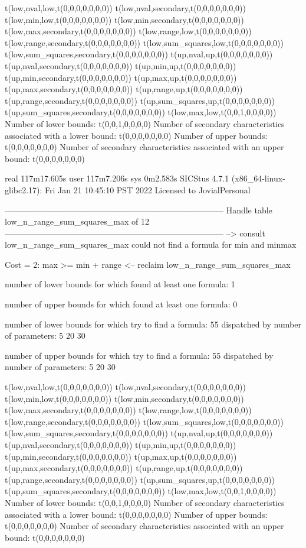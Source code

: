 t(low,nval,low,t(0,0,0,0,0,0,0))
t(low,nval,secondary,t(0,0,0,0,0,0,0))
t(low,min,low,t(0,0,0,0,0,0,0))
t(low,min,secondary,t(0,0,0,0,0,0,0))
t(low,max,secondary,t(0,0,0,0,0,0,0))
t(low,range,low,t(0,0,0,0,0,0,0))
t(low,range,secondary,t(0,0,0,0,0,0,0))
t(low,sum_squares,low,t(0,0,0,0,0,0,0))
t(low,sum_squares,secondary,t(0,0,0,0,0,0,0))
t(up,nval,up,t(0,0,0,0,0,0,0))
t(up,nval,secondary,t(0,0,0,0,0,0,0))
t(up,min,up,t(0,0,0,0,0,0,0))
t(up,min,secondary,t(0,0,0,0,0,0,0))
t(up,max,up,t(0,0,0,0,0,0,0))
t(up,max,secondary,t(0,0,0,0,0,0,0))
t(up,range,up,t(0,0,0,0,0,0,0))
t(up,range,secondary,t(0,0,0,0,0,0,0))
t(up,sum_squares,up,t(0,0,0,0,0,0,0))
t(up,sum_squares,secondary,t(0,0,0,0,0,0,0))
t(low,max,low,t(0,0,1,0,0,0,0))
Number of lower bounds:                                             t(0,0,1,0,0,0,0)
Number of secondary characteristics associated with a lower bound:  t(0,0,0,0,0,0,0)
Number of upper bounds:                                             t(0,0,0,0,0,0,0)
Number of secondary characteristics associated with an upper bound: t(0,0,0,0,0,0,0)

real	117m17.605s
user	117m7.206s
sys	0m2.583s
SICStus 4.7.1 (x86_64-linux-glibc2.17): Fri Jan 21 10:45:10 PST 2022
Licensed to JovialPersonal


--------------------------------------------------------------------------------
Handle table low_n_range_sum_squares_max of 12
--------------------------------------------------------------------------------
--> consult low_n_range_sum_squares_max
could not find a formula for min and minmax

Cost =  2:  max >= min + range
<-- reclaim low_n_range_sum_squares_max

number of lower bounds for which found at least one formula: 1

number of upper bounds for which found at least one formula: 0

number of lower bounds for which try to find a formula: 55
dispatched by number of parameters: 5  20  30

number of upper bounds for which try to find a formula: 55
dispatched by number of parameters: 5  20  30

t(low,nval,low,t(0,0,0,0,0,0,0))
t(low,nval,secondary,t(0,0,0,0,0,0,0))
t(low,min,low,t(0,0,0,0,0,0,0))
t(low,min,secondary,t(0,0,0,0,0,0,0))
t(low,max,secondary,t(0,0,0,0,0,0,0))
t(low,range,low,t(0,0,0,0,0,0,0))
t(low,range,secondary,t(0,0,0,0,0,0,0))
t(low,sum_squares,low,t(0,0,0,0,0,0,0))
t(low,sum_squares,secondary,t(0,0,0,0,0,0,0))
t(up,nval,up,t(0,0,0,0,0,0,0))
t(up,nval,secondary,t(0,0,0,0,0,0,0))
t(up,min,up,t(0,0,0,0,0,0,0))
t(up,min,secondary,t(0,0,0,0,0,0,0))
t(up,max,up,t(0,0,0,0,0,0,0))
t(up,max,secondary,t(0,0,0,0,0,0,0))
t(up,range,up,t(0,0,0,0,0,0,0))
t(up,range,secondary,t(0,0,0,0,0,0,0))
t(up,sum_squares,up,t(0,0,0,0,0,0,0))
t(up,sum_squares,secondary,t(0,0,0,0,0,0,0))
t(low,max,low,t(0,0,1,0,0,0,0))
Number of lower bounds:                                             t(0,0,1,0,0,0,0)
Number of secondary characteristics associated with a lower bound:  t(0,0,0,0,0,0,0)
Number of upper bounds:                                             t(0,0,0,0,0,0,0)
Number of secondary characteristics associated with an upper bound: t(0,0,0,0,0,0,0)

